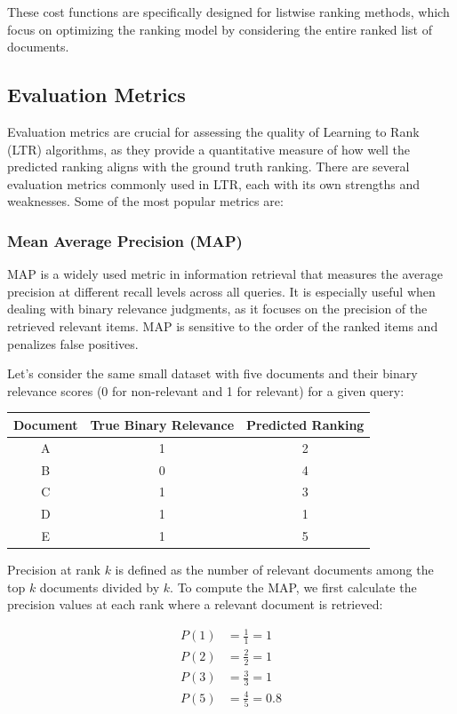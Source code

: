 \documentclass[12pt]{article}
\begin{document}
These cost functions are specifically designed for listwise ranking methods, which focus on optimizing the ranking model by considering the entire ranked list of documents.

\subsection{Evaluation Metrics}

Evaluation metrics are crucial for assessing the quality of Learning to Rank (LTR) algorithms, as they provide a quantitative measure of how well the predicted ranking aligns with the ground truth ranking. There are several evaluation metrics commonly used in LTR, each with its own strengths and weaknesses. Some of the most popular metrics are:

\subsubsection{Mean Average Precision (MAP)}
MAP is a widely used metric in information retrieval that measures the average precision at different recall levels across all queries. It is especially useful when dealing with binary relevance judgments, as it focuses on the precision of the retrieved relevant items. MAP is sensitive to the order of the ranked items and penalizes false positives.

Let's consider the same small dataset with five documents and their binary relevance scores (0 for non-relevant and 1 for relevant) for a given query:

\begin{table}[h]
\centering
\begin{tabular}{c|c|c}
\textbf{Document} & \textbf{True Binary Relevance} & \textbf{Predicted Ranking} \\
\hline
A & 1 & 2 \\
B & 0 & 4 \\
C & 1 & 3 \\
D & 1 & 1 \\
E & 1 & 5 \\
\end{tabular}
\end{table}

Precision at rank $k$ is defined as the number of relevant documents among the top $k$ documents divided by $k$. To compute the MAP, we first calculate the precision values at each rank where a relevant document is retrieved:

\begin{align*}
P(1) &= \frac{1}{1} = 1 \\
P(2) &= \frac{2}{2} = 1 \\
P(3) &= \frac{3}{3} = 1 \\
P(5) &= \frac{4}{5} = 0.8
\end{align*}
\end{document}
